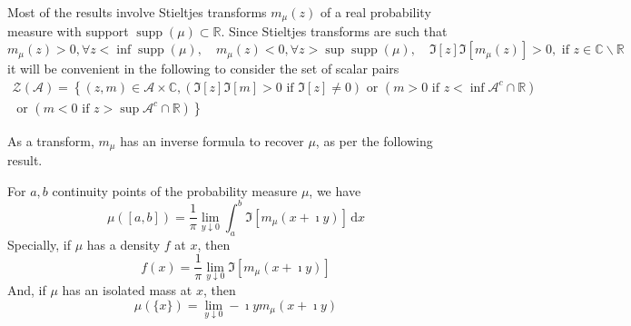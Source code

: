\begin{remark}
    Most of the results involve Stieltjes transforms $m_{\mu}(z)$ of a real probability measure with support $\operatorname{supp}(\mu) \subset \mathbb{R} .$ Since Stieltjes transforms are such that
    \begin{equation*}
        m_{\mu}(z)>0,\forall z<\inf\operatorname{supp}(\mu),\quad m_{\mu}(z)<0,\forall z>\sup \operatorname{supp}(\mu),\quad\Im[z] \Im\left[m_{\mu}(z)\right]>0,\text{ if }z\in\mathbb{C}\backslash\mathbb{R}
    \end{equation*}
    it will be convenient in the following to consider the set of scalar pairs
    \begin{equation*}
        \begin{array}{c}
            \mathcal{Z}(\mathcal{A})=\left\{(z,m)\in\mathcal{A}\times\mathbb{C},(\Im[z]\Im[m]>0\text{ if } \Im[z] \neq 0)\text{ or }\left(m>0\text{ if }z<\inf \mathcal{A}^{c} \cap \mathbb{R}\right)\right. \\
            \left.\text{ or }\left(m<0\text{ if }z>\sup \mathcal{A}^{c} \cap \mathbb{R}\right)\right\}
        \end{array}
    \end{equation*}
\end{remark}

As a transform, $m_{\mu}$ has an inverse formula to recover $\mu$, as per the following result.

\begin{theorem} \label{thm:inverse-stieltjes-transform}
    For $a,b$ continuity points of the probability measure $\mu$, we have
    \begin{equation}
        \mu\left([a,b]\right)=\frac{1}{\pi}\lim_{y\downarrow 0}\int_{a}^{b}\Im\left[m_{\mu}(x+\imath y)\right]\,\mathrm{d}x
    \end{equation}
    Specially, if $\mu$ has a density $f$ at $x$, then
    \begin{equation}
        f(x)=\frac{1}{\pi}\lim_{y\downarrow 0}\Im\left[m_{\mu}(x+\imath y)\right]
    \end{equation}
    And, if $\mu$ has an isolated mass at $x$, then
    \begin{equation}
        \mu(\{x\})=\lim_{y \downarrow 0}-\imath y m_{\mu}(x+\imath y)
    \end{equation}
\end{theorem}


